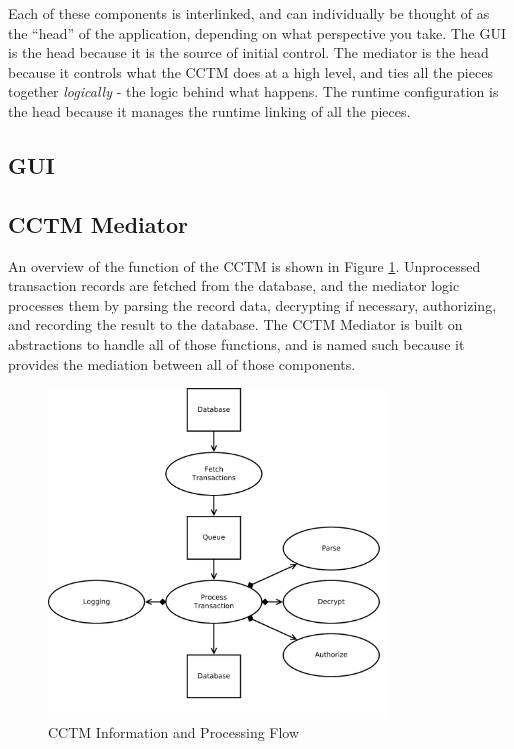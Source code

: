 \documentclass[a4paper,oneside,10pt]{report}
\begin{document}
Each of these components is interlinked, and can individually be thought of as the ``head'' of the application, depending on what perspective you take. The GUI is the head because it is the source of initial control. The mediator is the head because it controls what the CCTM does at a high level, and ties all the pieces together \emph{logically} - the logic behind what happens. The runtime configuration is the head because it manages the runtime linking of all the pieces.

\subsection{GUI}



\subsection{CCTM Mediator}\label{sec:CctmMediator}
An overview of the function of the CCTM is shown in Figure \ref{fig:CCTMFlow}. Unprocessed transaction records are fetched from the database, and the mediator logic processes them by parsing the record data, decrypting if necessary, authorizing, and recording the result to the database. The CCTM Mediator is built on abstractions to handle all of those functions, and is named such because it provides the mediation between all of those components.

\begin{figure}
	\centering
		\includegraphics[width=0.8\textwidth]{CCTM_Flow.pdf}
	\caption{CCTM Information and Processing Flow}
	\label{fig:CCTMFlow}
\end{figure}
\end{document}
